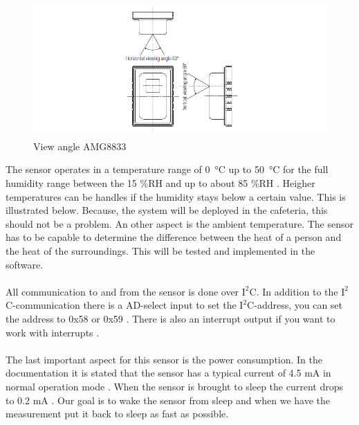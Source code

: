\documentclass[11pt,a4paper]{article}
\begin{document}
\begin{figure}[H]
	\centering
	\includegraphics[width=0.8\linewidth]{view_angle_AMG8833.png}
	\caption{View angle AMG8833 \cite{bib:AMG8833}}
	\label{fig:angleview}
\end{figure}
The sensor operates in a temperature range of \SI{0}{\celsius} up to \SI{50}{\celsius} for the full humidity range between the 15 \%RH and up to about 85 \%RH \cite{bib:AMG8833} . Heigher temperatures can be handles if the humidity stays below a certain value. This is illustrated below. Because, the system will be deployed in the cafeteria, this should not be a problem. An other aspect is the ambient temperature. The sensor has to be capable to determine the difference between the heat of a person and the heat of the surroundings. This will be tested and implemented in the software. 
\\ \\
All communication to and from the sensor is done over $\text{I}^2$C. In addition to the $\text{I}^2$C-communication there is a AD-select input to set the $\text{I}^2$C-address, you can set the address to 0x58 or 0x59 \cite{bib:AMG8833} . There is also an interrupt output if you want to work with interrupts \cite{bib:AMG8833}. 
\\ \\
The last important aspect for this sensor is the power consumption. In the documentation it is stated that the sensor has a typical current of 4.5 mA in normal operation mode \cite{bib:AMG8833} . When the sensor is brought to sleep the current drops to 0.2 mA \cite{bib:AMG8833} . Our goal is to wake the sensor from sleep and when we have the measurement put it back to sleep as fast as possible.
\end{document}
